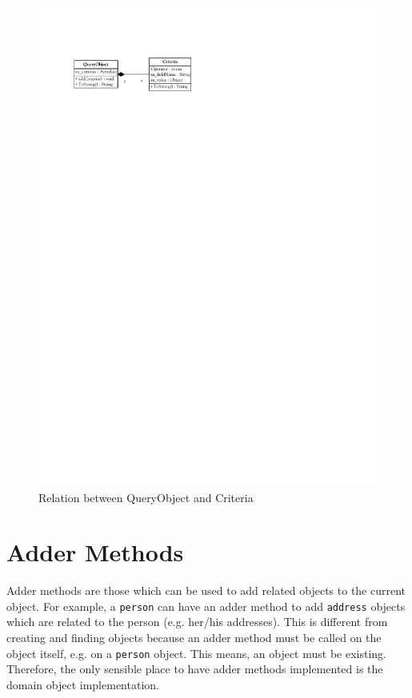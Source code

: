			\begin{figure}[htb]
				\begin{center}
					\includegraphics{./files/inc/figures/DesignQueryObjectAndCriteria}
					\caption{\label{fig:DesignQueryObjectAndCriteria}Relation between QueryObject and Criteria}
				\end{center}
			\end{figure}
			
	
	\section{Adder Methods}
		Adder methods are those which can be used to add related objects to the current object. For example,
		a \verb~person~ can have an adder method to add \verb~address~ objects which are related to
		the person (e.g. her/his addresses). This is different from creating and finding objects because an
		adder method must be called on the object itself, e.g. on a \verb~person~ object. This means,
		an object must be existing. Therefore, the only sensible place to have adder methods
		implemented is the domain object implementation.
		
